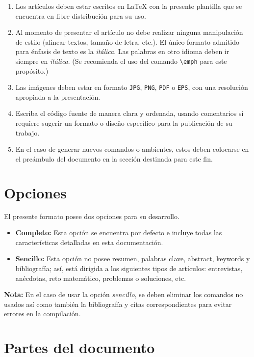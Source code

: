 \documentclass{aleph-revista}
\begin{document}
\begin{enumerate}
\item 
    Los artículos deben estar escritos en \LaTeX{} con la presente plantilla que se encuentra en libre distribución para su uso.
\item 
    Al momento de presentar el artículo no debe realizar ninguna manipulación de estilo (alinear textos, tamaño de letra, etc.). El único formato admitido para énfasis de texto es la \textit{itálica}. Las palabras en otro idioma deben ir siempre en \textit{itálica}. (Se recomienda el uso del comando \verb|\emph| para este propósito.)
\item 
    Las imágenes deben estar en formato \texttt{JPG}, \texttt{PNG}, \texttt{PDF} o \texttt{EPS}, con una resolución apropiada a la presentación.
\item 
    Escriba el código fuente de manera clara y ordenada, usando comentarios si requiere sugerir un formato o diseño específico para la publicación de su trabajo. 
\item 
    En el caso de generar nuevos comandos o ambientes, estos deben colocarse en el preámbulo del documento en la sección destinada para este fin.
\end{enumerate}

\section{Opciones}
El presente formato posee dos opciones para su desarrollo. 

\begin{itemize}
    \item \textbf{Completo:} Esta opción se encuentra por defecto e incluye todas las características detalladas en esta documentación.
    \item \textbf{Sencillo:} Esta opción no posee resumen, palabras clave, abstract, keywords y bibliografía; así, está dirigida a los siguientes tipos de artículos: entrevistas, anécdotas, reto matemático, problemas o soluciones, etc. 
\end{itemize}

\textbf{Nota:} En el caso de usar la opción \emph{sencillo}, se deben eliminar los comandos no usados así como también la bibliografía y citas correspondientes para evitar errores en la compilación. 
\section{Partes del documento}
\end{document}
